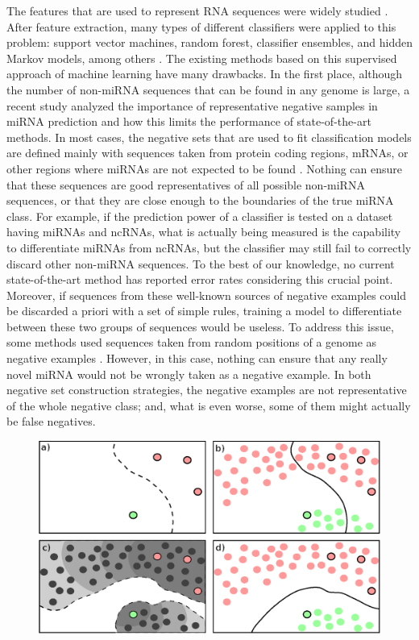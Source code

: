 \documentclass{article}
\begin{document}
The features that are used to represent RNA sequences were widely studied \citep{de2014discriminant, yones2015mirnafe}. After feature extraction, many types of different classifiers were applied to this problem: support vector machines, random forest, classifier ensembles, and hidden Markov models, among others \citep{kleftogiannis2013where}. The existing methods based on this supervised approach of machine learning have many drawbacks. In the first place, although the number of non-miRNA sequences that can be found in any genome is large, a recent study \citep{wei2014improved} analyzed the importance of representative negative samples in miRNA prediction and how this limits the performance of state-of-the-art methods. In most cases, the negative sets that are used to fit classification models are defined mainly with sequences taken from protein coding regions, mRNAs, or other regions where miRNAs are not expected to be found \citep{peace2015framework}. Nothing can ensure that these sequences are good representatives of all possible non-miRNA sequences, or that they are close enough to the boundaries of the true miRNA class. For example, if the prediction power of a classifier is tested on a dataset having miRNAs and ncRNAs, what is actually being measured is the capability to differentiate miRNAs from ncRNAs, but the classifier may still fail to correctly discard other non-miRNA sequences. To the best of our knowledge, no current state-of-the-art method has reported error rates considering this crucial point. Moreover, if sequences from these well-known sources of negative examples could be discarded a priori with a set of simple rules, training a model to differentiate between these two groups of sequences would be useless. To address this issue, some methods used sequences taken from random positions of a genome as negative examples \citep{wenyuan2013training,gudys2013huntmi}. However, in this case, nothing can ensure that any really novel miRNA would not be wrongly taken as a negative example. In both negative set construction strategies, the negative examples are not representative of the whole negative class; and, what is even worse, some of them might actually be false negatives. 
\begin{figure}[tpb]
	\centering
	\includegraphics[width=0.6\linewidth]{supervssemi2.eps}
	\label{fig:semivssuper}
\end{figure}
\end{document}

